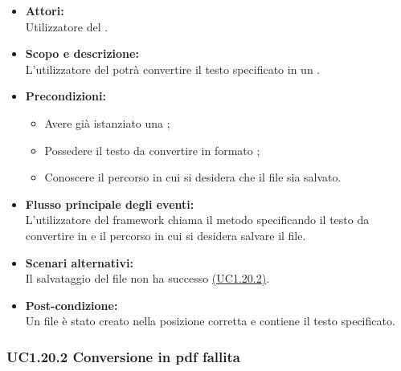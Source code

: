 \begin{itemize}
	\item \textbf{Attori:}
	\\Utilizzatore del .
	\item \textbf{Scopo e descrizione:} 
	\\L’utilizzatore del  potrà convertire il testo specificato in un .
	\item \textbf{Precondizioni:}
	\begin{itemize}
		\item Avere già istanziato una ;
		\item Possedere il testo da convertire in formato ;
		\item Conoscere il percorso in cui si desidera che il file sia salvato.
	\end{itemize}
	\item \textbf{Flusso principale degli eventi:}
	\\L’utilizzatore del framework chiama il metodo specificando il testo da convertire in  e il percorso in cui si desidera salvare il file.
	\item \textbf{Scenari alternativi:}
	\\Il salvataggio del file  non ha successo \hyperref[UC1.20.2]{(UC1.20.2)}.
	\item \textbf{Post-condizione:}
	\\Un file  è stato creato nella posizione corretta e contiene il testo specificato.
\end{itemize}

\subsubsection{UC1.20.2 Conversione in pdf fallita} \label{UC1.20.2}

